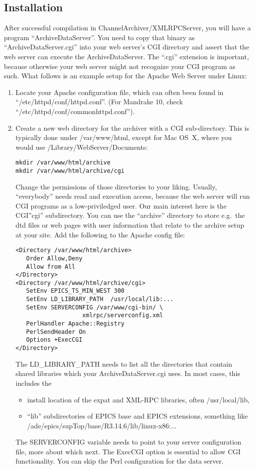 \subsection{Installation} %
After successful compilation in ChannelArchiver/XMLRPCServer, you will
have a program ``ArchiveDataServer''. You need to copy that binary as
``ArchiveDataServer.cgi'' into your web server's CGI directory and
assert that the web server can execute the ArchiveDataServer.
The ``.cgi'' extension is important, because otherwise your web server
might not recognize your CGI program as such.
What follows is an example setup for the Apache Web Server under Linux:
\begin{enumerate}
\item Locate your Apache configuration file, which can often been
  found in ``/etc/httpd/conf/httpd.conf''. (For Mandrake 10, check
  ``/etc/httpd/conf/commonhttpd.conf'').
\item Create a new web directory for the archiver with a CGI
   sub-directory. This is typically done under /var/www/html,
   except for Mac OS~X, where you would use /Library/WebServer/Documents:
\begin{lstlisting}[keywordstyle=\sffamily]
mkdir /var/www/html/archive
mkdir /var/www/html/archive/cgi
\end{lstlisting}
   Change the permissions of those directories to your liking.
   Usually, ``everybody'' needs read and execution access, because
   the web server will run CGI programs as a low-priviledged user. 
   Our main interest here is the CGI''cgi'' subdirectory.
   You can use the ``archive'' directory to store e.g.\ the dtd files
   or web pages with user information that relate to the archive setup
   at your site.
   Add the following to the Apache config file:
\begin{lstlisting}[keywordstyle=\sffamily]
<Directory /var/www/html/archive>
   Order Allow,Deny
   Allow from All
</Directory>
<Directory /var/www/html/archive/cgi>
   SetEnv EPICS_TS_MIN_WEST 300
   SetEnv LD_LIBRARY_PATH  /usr/local/lib:...
   SetEnv SERVERCONFIG /var/www/cgi-bin/ \
                   xmlrpc/serverconfig.xml
   PerlHandler Apache::Registry
   PerlSendHeader On
   Options +ExecCGI
</Directory>
\end{lstlisting}
  The LD\_LIBRARY\_PATH needs to list all the directories that
  contain shared libraries which your ArchiveDataServer.cgi uses.
  In most cases, this includes the
  \begin{itemize}
  \item install location of the expat and XML-RPC
        libraries, often /usr/local/lib,
  \item ``lib'' subdirectories of EPICS base and EPICS extensions,
        something like /ade/epics/supTop/base/R3.14.6/lib/linux-x86:...
  \end{itemize}
  The SERVERCONFIG variable needs to point to your server configuration
  file, more about which next. The ExecCGI option is essential to
  allow CGI functionality. You can skip the Perl configuration for the
  data server.
\end{enumerate}

